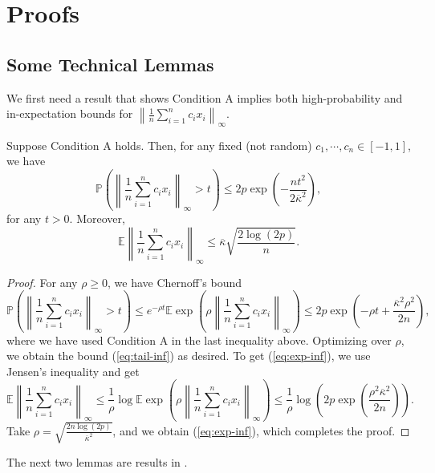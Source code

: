 

\section{Proofs}
\label{sec:proofs}

\subsection{Some Technical Lemmas}

We first need a result that shows Condition A implies both high-probability and in-expectation bounds for $\left\|\frac{1}{n}\sum_{i=1}^nc_ix_i\right\|_{\infty}$.

\begin{lemma}\label{lem:random-part}
Suppose Condition A holds. Then, for any fixed (not random) $c_1,\cdots,c_n\in[-1,1]$, we have
\begin{equation}
\mathbb{P}\left(\left\|\frac{1}{n}\sum_{i=1}^nc_ix_i\right\|_{\infty}>t\right)\leq 2p\exp\left(-\frac{nt^2}{2\overline{\kappa}^2}\right), \label{eq:tail-inf}
\end{equation}
for any $t>0$. Moreover,
\begin{equation}
\mathbb{E}\left\|\frac{1}{n}\sum_{i=1}^nc_ix_i\right\|_{\infty} \leq \overline{\kappa}\sqrt{\frac{2\log(2p)}{n}}. \label{eq:exp-inf}
\end{equation}
\end{lemma}
\begin{proof}
For any $\rho\geq 0$, we have Chernoff's bound
$$\mathbb{P}\left(\left\|\frac{1}{n}\sum_{i=1}^nc_ix_i\right\|_{\infty}>t\right) \leq e^{-\rho t}\mathbb{E}\exp\left(\rho\left\|\frac{1}{n}\sum_{i=1}^nc_ix_i\right\|_{\infty}\right) \leq 2p\exp\left(-\rho t+\frac{\overline{\kappa}^2\rho^2}{2n}\right),$$
where we have used Condition A in the last inequality above. Optimizing over $\rho$, we obtain the bound (\ref{eq:tail-inf}) as desired. To get (\ref{eq:exp-inf}), we use Jensen's inequality and get
$$\mathbb{E}\left\|\frac{1}{n}\sum_{i=1}^nc_ix_i\right\|_{\infty} \leq \frac{1}{\rho}\log\mathbb{E}\exp\left(\rho\left\|\frac{1}{n}\sum_{i=1}^nc_ix_i\right\|_{\infty}\right) \leq \frac{1}{\rho}\log\left(2p\exp\left(\frac{\rho^2\overline{\kappa}^2}{2n}\right)\right).$$
Take $\rho=\sqrt{\frac{2n\log(2p)}{\overline{\kappa}^2}}$, and we obtain (\ref{eq:exp-inf}), which completes the proof.
\end{proof}


The next two lemmas are results in \cite{wang2013l1}.

